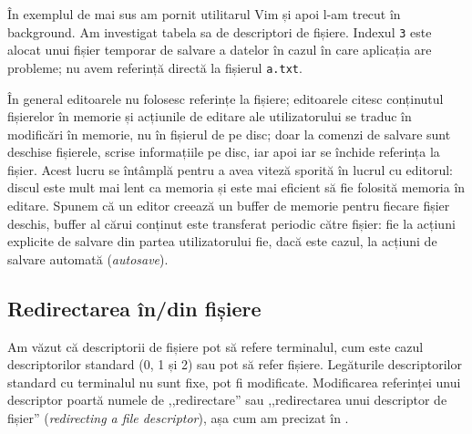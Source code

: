 
În exemplul de mai sus am pornit utilitarul Vim și apoi l-am trecut în background. Am investigat tabela sa de descriptori de fișiere. Indexul \texttt{3} este alocat unui fișier temporar de salvare a datelor în cazul în care aplicația are probleme; nu avem referință directă la fișierul \texttt{a.txt}.

În general editoarele
nu folosesc referințe la fișiere; editoarele citesc conținutul fișierelor în
memorie și acțiunile de editare ale utilizatorului se traduc în modificări în
memorie, nu în fișierul de pe disc; doar la comenzi de salvare sunt deschise
fișierele, scrise informațiile pe disc, iar apoi iar se închide referința la
fișier. Acest lucru se întâmplă pentru a avea viteză sporită în lucrul cu
editorul: discul este mult mai lent ca memoria și este mai eficient să fie
folosită memoria în editare. Spunem că un editor creează un buffer de memorie
pentru fiecare fișier deschis, buffer al cărui conținut este transferat periodic
către fișier: fie la acțiuni explicite de salvare din partea utilizatorului fie,
dacă este cazul, la acțiuni de salvare automată (\textit{autosave}).

\subsection{Redirectarea în/din fișiere}
\label{sec:procese-fisiere-redirectare}

Am văzut că descriptorii de fișiere pot să refere terminalul, cum este cazul
descriptorilor standard (0, 1 și 2) sau pot să refer fișiere. Legăturile
descriptorilor standard cu terminalul nu sunt fixe, pot fi modificate.
Modificarea referinței unui descriptor poartă numele de ,,redirectare'' sau
,,redirectarea unui descriptor de fișier'' (\textit{redirecting a file
descriptor}), așa cum am precizat în .

